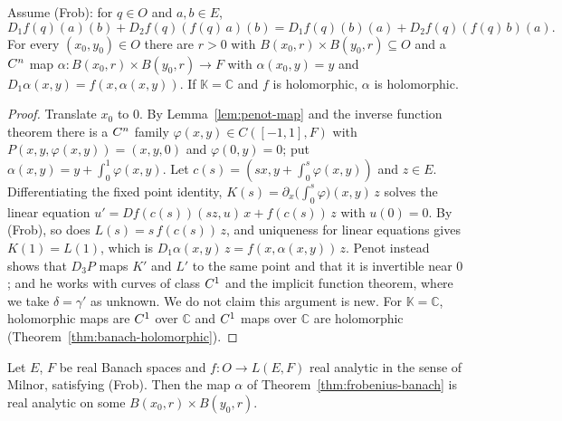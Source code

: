 \begin{theorem}
  \label{thm:frobenius-banach}
  \leanok
  Assume (Frob): for $q \in O$ and $a, b \in E$,
  \[ D_1 f(q)(a)(b) + D_2 f(q)(f(q)\,a)(b) = D_1 f(q)(b)(a) + D_2 f(q)(f(q)\,b)(a). \]
  For every $(x_0, y_0) \in O$ there are $r > 0$ with $B(x_0, r) \times B(y_0, r) \subseteq O$ and
  a $C^{n}$ map $\alpha \colon B(x_0, r) \times B(y_0, r) \to F$ with $\alpha(x_0, y) = y$ and
  $D_1 \alpha(x, y) = f(x, \alpha(x, y))$. If $\mathbb{K} = \mathbb{C}$ and $f$ is holomorphic,
  $\alpha$ is holomorphic.
\end{theorem}

\begin{proof}
  \leanok
  Translate $x_0$ to $0$. By Lemma~\ref{lem:penot-map} and the inverse function theorem there is a
  $C^{n}$ family $\varphi(x, y) \in C([-1, 1], F)$ with $P(x, y, \varphi(x, y)) = (x, y, 0)$ and
  $\varphi(0, y) = 0$; put $\alpha(x, y) = y + \int_0^1 \varphi(x, y)$. Let
  $c(s) = (sx, y + \int_0^s \varphi(x, y))$ and $z \in E$. Differentiating the fixed point
  identity, $K(s) = \partial_x\bigl(\int_0^s \varphi\bigr)(x, y)\,z$ solves the linear equation
  $u' = Df(c(s))(sz, u)\,x + f(c(s))\,z$ with $u(0) = 0$. By (Frob), so does
  $L(s) = s\, f(c(s))\,z$, and uniqueness for linear equations gives $K(1) = L(1)$, which is
  $D_1 \alpha(x, y)\,z = f(x, \alpha(x, y))\,z$. Penot instead shows that $D_3 P$ maps $K'$ and
  $L'$ to the same point and that it is invertible near $0$; and he works with curves of class
  $C^{1}$ and the implicit function theorem, where we take $\delta = \gamma'$ as unknown. We do
  not claim this argument is new. For $\mathbb{K} = \mathbb{C}$, holomorphic maps are $C^{1}$
  over $\mathbb{C}$ and $C^{1}$ maps over $\mathbb{C}$ are holomorphic
  (Theorem~\ref{thm:banach-holomorphic}).
\end{proof}

\begin{theorem}
  \label{thm:frobenius-real-analytic}
  \leanok
  Let $E$, $F$ be real Banach spaces and $f \colon O \to L(E, F)$ real analytic in the sense of
  Milnor, satisfying (Frob). Then the map $\alpha$ of Theorem~\ref{thm:frobenius-banach} is real
  analytic on some $B(x_0, r) \times B(y_0, r)$.
\end{theorem}

